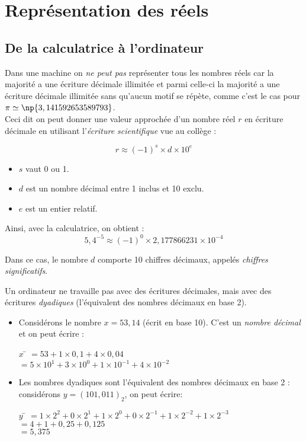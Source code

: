 \chapter{Représentation des réels}


\section{De la calculatrice à l'ordinateur}
Dans une machine on \textit{ne peut pas} représenter tous les nombres réels car la majorité a une écriture décimale illimitée et parmi celle-ci la majorité a une écriture décimale illimitée sans qu'aucun motif se répète, comme c'est le cas pour $\pi\simeq\np{3,141 592 653 589 793}$.\\
Ceci dit on peut donner une valeur approchée d'un nombre réel $r$ en écriture décimale en
utilisant l'\textit{écriture scientifique} vue au collège :

$$\boxed{r\approx (-1)^s\times d\times 10^{e}}$$

\begin{itemize}
    \item   $s$ vaut 0 ou 1.
    \item   $d$ est un nombre décimal entre 1 inclus et 10 exclu.
    \item   $e$ est un entier relatif.
\end{itemize}

Ainsi, avec la calculatrice, on obtient :
$$\boxed{5,4^{-5}\approx (-1)^0\times 2,177866231\times10^{-4}}$$

Dans ce cas, le nombre $d$ comporte 10 chiffres décimaux, appelés \textit{chiffres significatifs}.

Un ordinateur ne travaille pas avec des écritures décimales, mais avec des écritures \textit{dyadiques} (l'équivalent des nombres décimaux en
base 2).
\begin{exemple}
    \begin{itemize}
        \item   Considérons le nombre $x = 53,14$ (écrit en base 10). C'est un \textit{nombre décimal} et on peut écrire :
              \begin{tabbing}
                  $x$ \=  $=53+1\times 0,1+4\times 0,04$\\
                  \>  $=5\times 10^1+3\times 10^0+1\times 10^{-1}+4\times 10^{-2}$
              \end{tabbing}
        \item   Les nombres dyadiques sont l'équivalent des nombres décimaux en base 2 : considérons $y=(101,011)_2 $, on peut écrire:
              \begin{tabbing}
                  $y$ \=  $=1\times 2^2+0\times 2^1+1\times 2^0+0\times 2^{-1}+1\times 2^{-2}+1\times 2^{-3}$\\
                  \>  $=4+1+0,25+0,125$\\
                  \>  $=5,375$
              \end{tabbing}
    \end{itemize}
\end{exemple}

